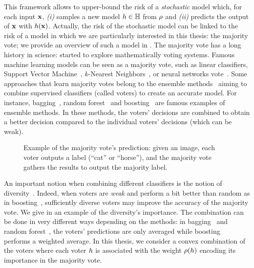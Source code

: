 This framework allows to upper-bound the risk of a {\it stochastic} model which, for each input $\mathbf{x}$, {\it (i)} samples a new model $h\in\mathbb{H}$ from $\rho$ and {\it (ii)} predicts the output of $\mathbf{x}$ with $h(\mathbf{x})$.
Actually, the risk of the stochastic model can be linked to the risk of a model in which we are particularly interested in this thesis: the majority vote; we provide an overview of such a model in .
The majority vote has a long history in science: \citet{Condorcet1785} started to explore mathematically voting systems.
Famous machine learning models can be seen as a majority vote, such as linear classifiers, Support Vector Machine~\citep{GraepelHerbrichShaweTaylor2005}, $k$-Nearest Neighbors~\citep{BelletHabrardMorvantSebban2014}, or neural networks vote~\citep{KawaguchiPackKaelblingBengio2017, ViallardGermainHabrardMorvant2019}.
Some approaches that learn majority votes belong to the ensemble methods~\citep{Dietterich2000} aiming to combine supervised classifiers (called voters) to create an accurate model.
For instance, bagging~\citep{Breiman1996}, random forest~\citep{Breiman2001} and boosting~\citep{FreundSchapire1996} are famous examples of ensemble methods.
In these methods, the voters' decisions are combined to obtain a better decision compared to the individual voters' decisions (which can be weak).
\begin{figure}
  \centering
  
  \caption[Example of the Majority Vote's Prediction]{
Example of the majority vote's prediction: given an image, each voter outputs a label (``cat'' or ``horse''), and the majority vote gathers the results to output the majority label.   
  }
    \label{chap:prelim:fig:mv-pred}
\end{figure}
An important notion when combining different classifiers is the notion of diversity~\citep{Dietterich2000,Kuncheva2014}.
Indeed, when voters are {\it weak} and perform a bit better than random as in boosting~\citep{FreundSchapire1996}, sufficiently diverse voters may improve the accuracy of the majority vote.
We give in  an example of the diversity's importance.
The combination can be done in very different ways depending on the methods: in bagging~\citep{Breiman1996} and random forest~\citep{Breiman2001}, the voters' predictions are only averaged while boosting~\citep{FreundSchapire1996} performs a weighted average.
In this thesis, we consider a convex combination of the voters where each voter $h$ is associated with the weight $\rho(h)$ encoding its importance in the majority vote.
